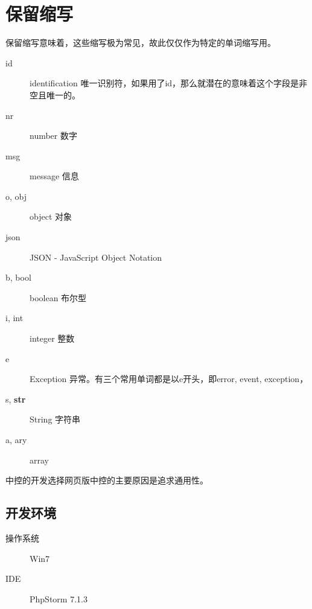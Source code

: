 \chapter{保留缩写}
保留缩写意味着，这些缩写极为常见，故此仅仅作为特定的单词缩写用。
\begin{description}
\item[id] identification  唯一识别符，如果用了id，那么就潜在的意味着这个字段是非空且唯一的。
\item[nr]  number 数字
\item[msg] message 信息
\item[o, obj] object 对象
\item[json] JSON - JavaScript Object Notation
\item[b, bool] boolean 布尔型
\item[i, int] integer 整数
\item[e] Exception 异常。有三个常用单词都是以e开头，即error, event, exception，
\item[s, \textbf{str}] String 字符串
\item[a, ary] array

\end{description}



中控的开发选择网页版中控的主要原因是追求通用性。

\section{开发环境}
\begin{description}
\item[操作系统] Win7
\item[IDE] PhpStorm 7.1.3
\end{description}


